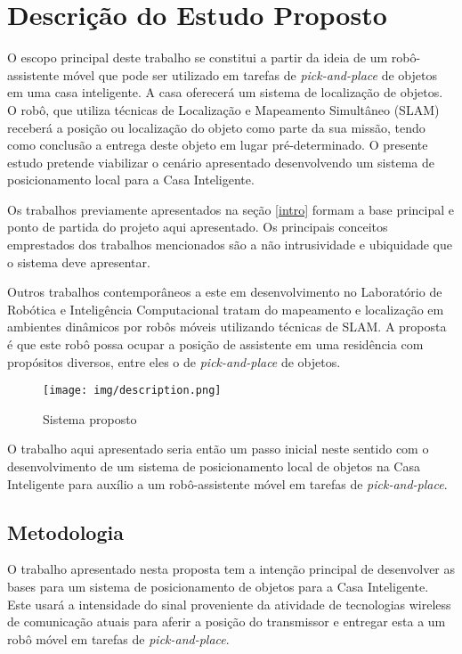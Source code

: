 \section{Descrição do Estudo Proposto}\label{description}
O escopo principal deste trabalho se constitui a partir da ideia de um robô-assistente móvel que pode ser utilizado em tarefas de \textit{pick-and-place} de objetos em uma casa inteligente. A casa oferecerá um sistema de localização de objetos. O robô, que utiliza técnicas de Localização e Mapeamento Simultâneo (SLAM) receberá a posição ou localização do objeto como parte da sua missão, tendo como conclusão a entrega deste objeto em lugar pré-determinado. O presente estudo pretende viabilizar o cenário apresentado desenvolvendo um sistema de posicionamento local para a Casa Inteligente.


Os trabalhos \cite{Nascimento2002, Lima2005, Botelho2005, Carvalho2008} previamente apresentados na seção \ref{intro} formam a base principal e ponto de partida do projeto aqui apresentado. Os principais conceitos emprestados dos trabalhos mencionados são a não intrusividade e ubiquidade que o sistema deve apresentar.

Outros trabalhos contemporâneos a este em desenvolvimento no Laboratório de Robótica e Inteligência Computacional tratam do mapeamento e localização em ambientes dinâmicos por robôs móveis utilizando técnicas de SLAM. A proposta é que este robô possa ocupar a posição de assistente em uma residência com propósitos diversos, entre eles o de \textit{pick-and-place} de objetos.

\begin{figure}[ht]
\centering
\texttt{[image: img/description.png]}
\caption{Sistema proposto}
\end{figure}

O trabalho aqui apresentado seria então um passo inicial neste sentido com o desenvolvimento de um sistema de posicionamento local de objetos na Casa Inteligente para auxílio a um robô-assistente móvel em tarefas de \textit{pick-and-place}.

\subsection{Metodologia}
O trabalho apresentado nesta proposta tem a intenção principal de desenvolver as bases para um sistema de posicionamento de objetos para a Casa Inteligente. Este usará a intensidade do sinal proveniente da atividade de tecnologias wireless de comunicação atuais para aferir a posição do transmissor e entregar esta a um robô móvel em tarefas de \textit{pick-and-place}.

